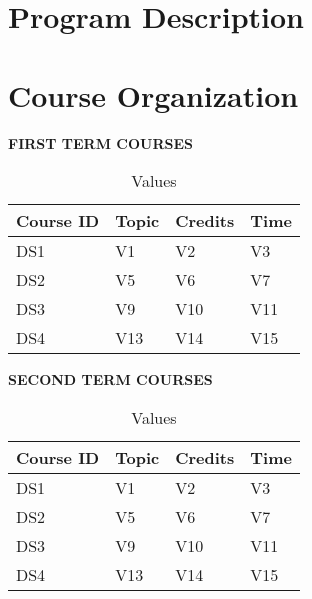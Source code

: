 \documentclass{article}
\begin{document}

\newpage
\tableofcontents
\newpage


\section{Program Description}
\section{Course Organization}



\textbf{\large FIRST TERM COURSES}\\

\begin{table}[H]
    \caption{Values}
    \label{tab:n}
    \centering
    \begin{tabularx}{\textwidth}{*{4}{X}}
      \toprule
      Course ID & Topic & Credits & Time  \\ 
      \midrule
      DS1 & V1         & V2         & V3         \\ 
      \midrule
      DS2 & V5         & V6         & V7          \\ 
      \midrule
      DS3 & V9         & V10        & V11        \\ 
      \midrule
      DS4 & V13        & V14        & V15        \\
      \bottomrule
    \end{tabularx}
    \centering

\end{table}

\noindent
\textbf{\large SECOND TERM COURSES }\\

\begin{table}[H]
    \caption{Values}
    \label{tab:n}
    \centering
    \begin{tabularx}{\textwidth}{*{4}{X}}
      \toprule
      Course ID & Topic & Credits & Time  \\ 
      \midrule
      DS1 & V1         & V2         & V3         \\ 
      \midrule
      DS2 & V5         & V6         & V7          \\ 
      \midrule
      DS3 & V9         & V10        & V11        \\ 
      \midrule
      DS4 & V13        & V14        & V15        \\
      \bottomrule
    \end{tabularx}
\end{table}
\end{document}
